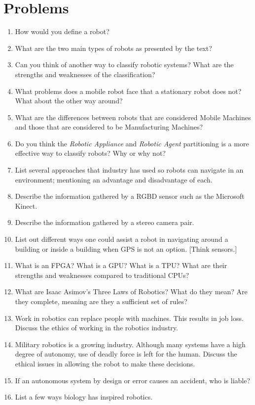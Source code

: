 \hypertarget{problems}{%
\section{Problems}\label{problems}}

\begin{enumerate}
\tightlist
\item
  How would you define a robot?
\item
  What are the two main types of robots as presented by the text?
\item
  Can you think of another way to classify robotic systems? What are the
  strengths and weaknesses of the classification?
\item
  What problems does a mobile robot face that a stationary robot does
  not? What about the other way around?
\item
  What are the differences between robots that are considered Mobile
  Machines and those that are considered to be Manufacturing Machines?
\item
  Do you think the \emph{Robotic Appliance} and \emph{Robotic Agent}
  partitioning is a more effective way to classify robots? Why or why
  not?
\item
  List several approaches that industry has used so robots can navigate
  in an environment; mentioning an advantage and disadvantage of each.
\item
  Describe the information gathered by a RGBD sensor such as the
  Microsoft Kinect.
\item
  Describe the information gathered by a stereo camera pair.
\item
  List out different ways one could assist a robot in navigating around
  a building or inside a building when GPS is not an option. {[}Think
  sensors.{]}
\item
  What is an FPGA? What is a GPU? What is a TPU? What are their
  strengths and weaknesses compared to traditional CPUs?
\item
  What are Isaac Asimov's Three Laws of Robotics? What do they mean? Are
  they complete, meaning are they a sufficient set of rules?
\item
  Work in robotics can replace people with machines. This results in job
  loss. Discuss the ethics of working in the robotics industry.
\item
  Military robotics is a growing industry. Although many systems have a
  high degree of autonomy, use of deadly force is left for the human.
  Discuss the ethical issues in allowing the robot to make these
  decisions.
\item
  If an autonomous system by design or error causes an accident, who is
  liable?
\item
  List a few ways biology has inspired robotics.
\end{enumerate}
